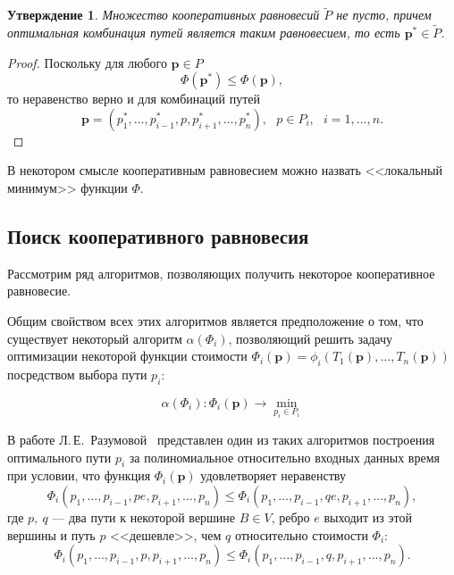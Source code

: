 \documentclass[12pt, a4paper]{article}
\newtheorem{state}{Утверждение}[section]
\begin{document}
\begin{state}
Множество кооперативных равновесий $\widetilde{P}$ не пусто, причем
оптимальная комбинация путей является таким равновесием, то есть $\textbf{p}^* \in \widetilde{P}$.
\end{state}

\begin{proof}
	Поскольку для любого $\textbf{p} \in P$ 
	$$\Phi (\textbf{p}^*) \le \Phi (\textbf{p}),$$
	то неравенство верно и для комбинаций путей $$\textbf{p} = \left(p^*_1, \ldots, p^*_{i - 1}, p, p^*_{i + 1}, \ldots, p^*_{n} \right), \text{ } p \in P_i, \text{ } i = 1, \ldots, n.$$
\end{proof}

В некотором смысле кооперативным равновесием можно назвать <<локальный минимум>> функции $\Phi$.

\subsection{Поиск кооперативного равновесия}
Рассмотрим ряд алгоритмов, позволяющих получить некоторое кооперативное равновесие.

Общим свойством всех этих алгоритмов является предположение о том, что существует некоторый алгоритм $\alpha (\Phi_i)$, позволяющий решить задачу оптимизации некоторой функции стоимости $\Phi_i (\textbf{p}) = \phi_i(T_1(\textbf{p}), \ldots, T_n(\textbf{p}))$ посредством выбора пути $p_i$:

\begin{equation}
\label{eq:task_mini}
\alpha (\Phi_i): \Phi_i (\textbf{p}) \rightarrow \min \limits _{p_i \in P_i}
\end{equation}

В работе Л.\,Е.~Разумовой~\cite{Luba} представлен один из таких алгоритмов построения оптимального пути $p_i$ за полиномиальное относительно входных данных время при условии, что функция $\Phi_i (\textbf{p})$ удовлетворяет неравенству
\begin{equation}
	\label{eq:luba_1}
	\Phi_i (p_1, \ldots, p_{i - 1}, pe, p_{i + 1}, \ldots, p_n) \le 
	\Phi_i (p_1, \ldots, p_{i - 1}, qe, p_{i + 1}, \ldots, p_n),
\end{equation}
где $p, \: q$ --- два пути к некоторой вершине $B \in V$, ребро $e$ выходит из этой вершины и путь $p$ <<дешевле>>, чем $q$ относительно стоимости $\Phi_i$:
\begin{equation}
	\label{eq:luba_2}
	\Phi_i (p_1, \ldots, p_{i - 1}, p, p_{i + 1}, \ldots, p_n) \le
  	\Phi_i (p_1, \ldots, p_{i - 1}, q, p_{i + 1}, \ldots, p_n).
\end{equation}
\end{document}
